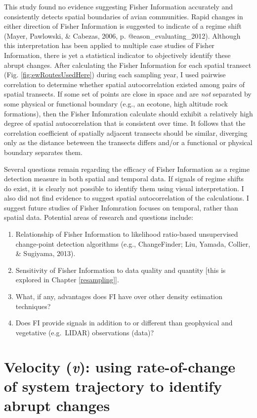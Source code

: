 \documentclass[12pt,twoside,openany]{reedthesis}
\providecommand{\tightlist}{%
  \setlength{\itemsep}{0pt}\setlength{\parskip}{0pt}}
\begin{document}
This study found no evidence suggesting Fisher Information accurately and consistently detects spatial boundaries of avian communities. Rapid changes in either direction of Fisher Information is suggested to indicate of a regime shift (Mayer, Pawlowski, \& Cabezas, 2006, p. @eason\_evaluating\_2012). Although this interpretation has been applied to multiple case studies of Fisher Information, there is yet a statistical indicator to objectively identify these abrupt changes. After calculating the Fisher Information for each spatial transect (Fig. \ref{fig:ewRoutesUsedHere}) during each sampling year, I used pairwise correlation to determine whether spatial autocorrelation existed among pairs of spatial transects. If some set of points are close in space and are \emph{not} separated by some physical or functional boundary (e.g., an ecotone, high altitude rock formations), then the Fisher Infomration calculate should exhibit a relatively high degree of spatial autocorrelation that is consistent over time. It follows that the correlation coefficient of spatially adjacent transects should be similar, diverging only as the distance beteween the transects differs and/or a functional or physical boundary separates them.

Several questions remain regarding the efficacy of Fisher Information as a regime detection measure in both spatial and temporal data. If signals of regime shifts do exist, it is clearly not possible to identify them using visual interpretation. I also did not find evidence to suggest spatial autocorrelation of the calculations. I suggest future studies of Fisher Infomration focuses on temporal, rather than spatial data. Potential areas of research and questions include:
\begin{enumerate}
\def\labelenumi{\arabic{enumi}.}
\tightlist
\item
  Relationship of Fisher Information to likelihood ratio-based unsupervised change-point detection algorithms (e.g., ChangeFinder; Liu, Yamada, Collier, \& Sugiyama, 2013).\\
\item
  Sensitivity of Fisher Information to data quality and quantity {[}this is explored in Chapter \ref{resampling}{]}.
\item
  What, if any, advantages does FI have over other density estimation techniques?
\item
  Does FI provide signals in addition to or different than geophysical and vegetative (e.g.~LIDAR) observations (data)?
\end{enumerate}
\hypertarget{velocity}{%
\chapter{\texorpdfstring{Velocity (\emph{v}): using rate-of-change of system trajectory to identify abrupt changes}{Velocity (v): using rate-of-change of system trajectory to identify abrupt changes}}\label{velocity}}
\end{document}
